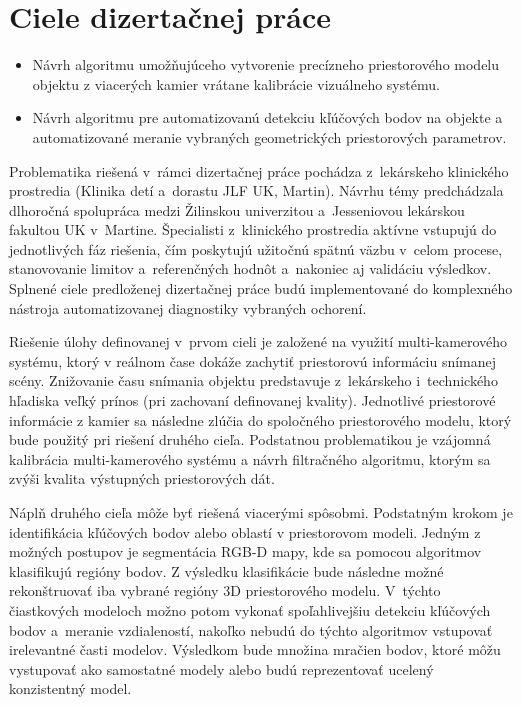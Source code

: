 \chapter{Ciele dizertačnej práce}
\label{kap:tezy}
\pagestyle{fancy}
\fancyhf{}
\fancyfoot[CE,CO]{\thepage}
\renewcommand{\footrulewidth}{1pt}



\begin{itemize}
	\item Návrh algoritmu umožňujúceho vytvorenie precízneho priestorového modelu objektu z viacerých kamier vrátane kalibrácie vizuálneho systému.
	\item Návrh algoritmu pre automatizovanú detekciu kľúčových bodov na objekte a automatizované meranie vybraných geometrických priestorových parametrov.
\end{itemize}


Problematika riešená v rámci dizertačnej práce pochádza z lekárskeho klinického prostredia (Klinika detí a dorastu JLF UK, Martin). Návrhu témy predchádzala dlhoročná spolupráca medzi Žilinskou univerzitou a Jesseniovou lekárskou fakultou UK v Martine. Špecialisti z klinického prostredia aktívne vstupujú do jednotlivých fáz riešenia, čím poskytujú užitočnú spätnú väzbu v celom procese, stanovovanie limitov a referenčných hodnôt a nakoniec aj validáciu výsledkov. Splnené ciele predloženej dizertačnej práce budú implementované do komplexného nástroja automatizovanej diagnostiky vybraných ochorení. \newline

Riešenie úlohy definovanej v prvom cieli je založené na využití multi-kamerového systému, ktorý v reálnom čase dokáže zachytiť priestorovú informáciu snímanej scény. Znižovanie času snímania objektu predstavuje z lekárskeho i technického hľadiska veľký prínos (pri zachovaní definovanej kvality). Jednotlivé priestorové informácie z kamier sa následne zlúčia do spoločného priestorového modelu, ktorý bude použitý pri riešení druhého cieľa. Podstatnou problematikou je vzájomná kalibrácia multi-kamerového systému a návrh filtračného algoritmu, ktorým sa zvýši kvalita výstupných priestorových dát. 

\newpage
Náplň druhého cieľa môže byť riešená viacerými spôsobmi. Podstatným krokom je identifikácia kľúčových bodov alebo oblastí v priestorovom modeli. Jedným z možných postupov je segmentácia RGB-D mapy, kde sa pomocou algoritmov klasifikujú regióny bodov. Z výsledku klasifikácie bude následne možné rekonštruovať iba vybrané regióny 3D priestorového modelu. V týchto čiastkových modeloch možno potom vykonať spoľahlivejšiu detekciu kľúčových bodov a meranie vzdialeností, nakoľko nebudú do týchto algoritmov vstupovať irelevantné časti modelov. Výsledkom bude množina mračien bodov, ktoré môžu vystupovať ako samostatné modely alebo budú reprezentovať ucelený konzistentný model.


